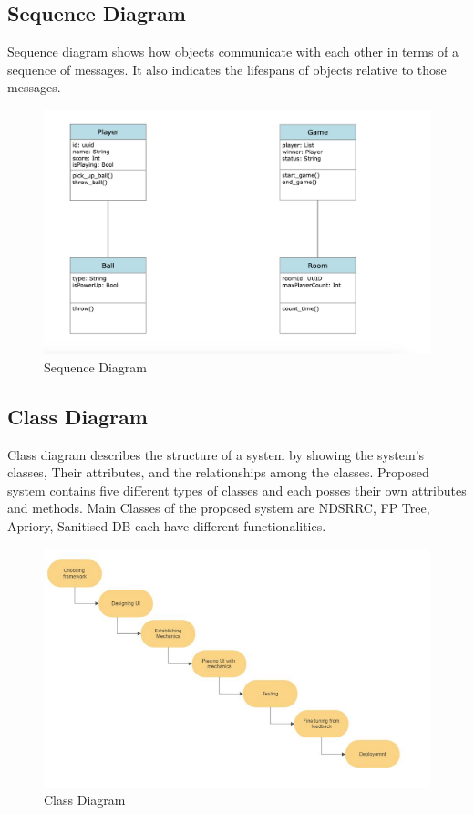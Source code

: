 \documentclass[12pt]{report}
\begin{document}
\justifying
\setlength{\parindent}{4em}
\setlength{\parskip}{0.5em}
\renewcommand{\baselinestretch}{1.5}
\normalsize
\subsection{Sequence Diagram}
Sequence diagram shows how objects communicate with each other in terms of a sequence 
of messages. It also indicates the lifespans of objects relative to those messages.
\vspace{1.5cm}
\begin{figure}[h]
\centering
\includegraphics[scale=0.9]{images14.png}
\caption{Sequence Diagram}
\label{Sequence Diagram}
\end{figure}

\clearpage
\justifying
\setlength{\parindent}{4em}
\setlength{\parskip}{0.5em}
\renewcommand{\baselinestretch}{1.5}
\normalsize
\subsection{ Class Diagram}
Class diagram describes the structure of a system by showing the system’s classes, Their
attributes, and the relationships among the classes. Proposed system contains five different 
types of classes and each posses their own attributes and methods. Main Classes of the 
proposed system are NDSRRC, FP Tree, Apriory, Sanitised DB each have different 
functionalities.
\vspace{1.5cm}
\begin{figure}[h]
\centering
\includegraphics[scale=0.9]{ Class Diagram.png}
\caption{ Class Diagram
}
\label{ Class Diagram
}
\end{figure}
\end{document}
